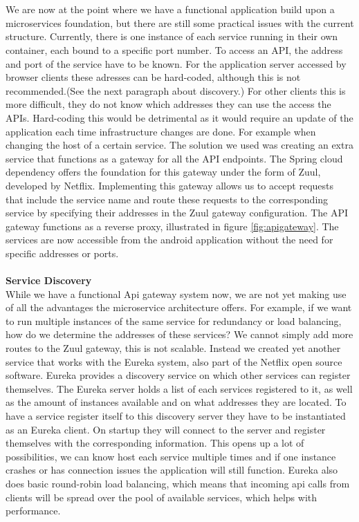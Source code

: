 \documentclass[12pt]{article}
\begin{document}
\begin{multicols}{2}
\\\\
We are now at the point where we have a functional application build upon a microservices foundation, but there are still some practical issues with the current structure. Currently, there is one instance of each service running in their own container, each bound to a specific port number. To access an API, the address and port of the service have to be known. For the application server accessed by browser clients these adresses can be hard-coded, although this is not recommended.(See the next paragraph about discovery.) For other clients this is more difficult, they do not know which addresses they can use the access the APIs. Hard-coding this would be detrimental as it would require an update of the application each time infrastructure changes are done. For example when changing the host of a certain service. The solution we used was creating an extra service that functions as a gateway for all the API endpoints. The Spring cloud dependency offers the foundation for this gateway under the form of Zuul, developed by Netflix. \cite{NetflixZuul76:online} Implementing this gateway allows us to accept requests that include the service name and route these requests to the corresponding service by specifying their addresses in the Zuul gateway configuration. The API gateway functions as a reverse proxy, illustrated in figure \ref{fig:apigateway}. The services are now accessible from the android application without the need for specific addresses or ports.
\\\\
\textbf{Service Discovery}\label{sub:discovery}\\
While we have a functional Api gateway system now, we are not yet making use of all the advantages the microservice architecture offers. For example, if we want to run multiple instances of the same service for redundancy or load balancing, how do we determine the addresses of these services? We cannot simply add more routes to the Zuul gateway, this is not scalable. Instead we created yet another service that works with the Eureka system, also part of the Netflix open source software. Eureka provides a discovery service on which other services can register themselves. The Eureka server holds a list of each services registered to it, as well as the amount of instances available and on what addresses they are located. To have a service register itself to this discovery server they have to be instantiated as an Eureka client. On startup they will connect to the server and register themselves with the corresponding information. This opens up a lot of possibilities, we can know host each service multiple times and if one instance crashes or has connection issues the application will still function. Eureka also does basic round-robin load balancing, which means that incoming api calls from clients will be spread over the pool of available services, which helps with performance.

\end{multicols}
\end{document}
